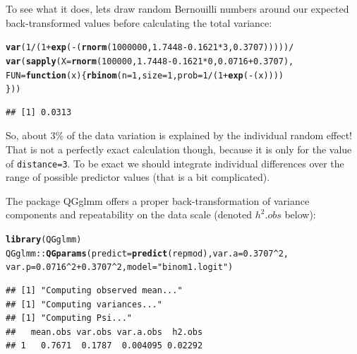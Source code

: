 \documentclass[12pt,a4paper]{scrartcl}\usepackage[]{graphicx}\usepackage[]{color}
\makeatletter
\newcommand{\hlnum}[1]{\textcolor[rgb]{0.686,0.059,0.569}{#1}}%
\newcommand{\hlstr}[1]{\textcolor[rgb]{0.192,0.494,0.8}{#1}}%
\newcommand{\hlopt}[1]{\textcolor[rgb]{0,0,0}{#1}}%
\newcommand{\hlstd}[1]{\textcolor[rgb]{0.345,0.345,0.345}{#1}}%
\newcommand{\hlkwa}[1]{\textcolor[rgb]{0.161,0.373,0.58}{\textbf{#1}}}%
\newcommand{\hlkwc}[1]{\textcolor[rgb]{0.333,0.667,0.333}{#1}}%
\newcommand{\hlkwd}[1]{\textcolor[rgb]{0.737,0.353,0.396}{\textbf{#1}}}%
\newenvironment{kframe}{%
 \def\at@end@of@kframe{}%
 \ifinner\ifhmode%
  \def\at@end@of@kframe{\end{minipage}}%
  \begin{minipage}{\columnwidth}%
 \fi\fi%
 \def\FrameCommand##1{\hskip\@totalleftmargin \hskip-\fboxsep
 \colorbox{shadecolor}{##1}\hskip-\fboxsep
     \hskip-\linewidth \hskip-\@totalleftmargin \hskip\columnwidth}%
 \MakeFramed {\advance\hsize-\width
   \@totalleftmargin\z@ \linewidth\hsize
   \@setminipage}}%
 {\par\unskip\endMakeFramed%
 \at@end@of@kframe}
\newenvironment{knitrout}{}{} %
\makeatother
\begin{document}
\begin{Answer}
To see what it does, lets draw random Bernouilli numbers around our expected back-transformed values before calculating the total variance:
\begin{knitrout}
\color{fgcolor}\begin{kframe}
\begin{alltt}
\hlkwd{var}\hlstd{(}\hlnum{1}\hlopt{/}\hlstd{(}\hlnum{1}\hlopt{+}\hlkwd{exp}\hlstd{(}\hlopt{-}\hlstd{(}\hlkwd{rnorm}\hlstd{(}\hlnum{1000000}\hlstd{,} \hlnum{1.7448}\hlopt{-}\hlnum{0.1621}\hlopt{*}\hlnum{3}\hlstd{,} \hlnum{0.3707}\hlstd{)))))} \hlopt{/}
  \hlkwd{var}\hlstd{(}\hlkwd{sapply}\hlstd{(}\hlkwc{X} \hlstd{=} \hlkwd{rnorm}\hlstd{(}\hlnum{100000}\hlstd{,} \hlnum{1.7448}\hlopt{-}\hlnum{0.1621}\hlopt{*}\hlnum{0}\hlstd{,} \hlnum{0.0716}\hlopt{+}\hlnum{0.3707}\hlstd{),}
        \hlkwc{FUN}\hlstd{=}\hlkwa{function}\hlstd{(}\hlkwc{x}\hlstd{)\{}\hlkwd{rbinom}\hlstd{(}\hlkwc{n} \hlstd{=} \hlnum{1}\hlstd{,} \hlkwc{size} \hlstd{=} \hlnum{1}\hlstd{,} \hlkwc{prob} \hlstd{=} \hlnum{1}\hlopt{/}\hlstd{(}\hlnum{1}\hlopt{+}\hlkwd{exp}\hlstd{(}\hlopt{-}\hlstd{(x))))}
                        \hlstd{\}))}
\end{alltt}
\begin{verbatim}
## [1] 0.0313
\end{verbatim}
\end{kframe}
\end{knitrout}

So, about 3\% of the data variation is explained by the individual random effect! That is not a perfectly exact calculation though, because it is only for the value of \texttt{distance=3}. To be exact we should integrate individual differences over the range of possible predictor values (that is a bit complicated).

The package QGglmm offers a proper back-transformation of variance components and repeatability on the data scale (denoted $h^2.obs$ below):
\begin{knitrout}
\color{fgcolor}\begin{kframe}
\begin{alltt}
\hlkwd{library}\hlstd{(QGglmm)}
\hlstd{QGglmm}\hlopt{::}\hlkwd{QGparams}\hlstd{(}\hlkwc{predict} \hlstd{=} \hlkwd{predict}\hlstd{(repmod),}\hlkwc{var.a} \hlstd{=} \hlnum{0.3707}\hlopt{^}\hlnum{2}\hlstd{,}
                 \hlkwc{var.p} \hlstd{=} \hlnum{0.0716}\hlopt{^}\hlnum{2}\hlopt{+}\hlnum{0.3707}\hlopt{^}\hlnum{2}\hlstd{,} \hlkwc{model} \hlstd{=} \hlstr{"binom1.logit"}\hlstd{)}
\end{alltt}
\begin{verbatim}
## [1] "Computing observed mean..."
## [1] "Computing variances..."
## [1] "Computing Psi..."
##   mean.obs var.obs var.a.obs  h2.obs
## 1   0.7671  0.1787  0.004095 0.02292
\end{verbatim}
\end{kframe}
\end{knitrout}

\end{Answer}
\end{document}
